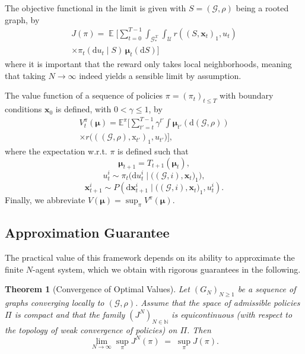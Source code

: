 \documentclass{article}
\newcommand{\E}{\operatorname{\mathbb E}}
\newtheorem{theorem}{Theorem}
\begin{document}
The objective functional in the limit is given with $S = (\mathcal{G}, \rho)$ being a rooted graph, by
\begin{multline}
    \label{equ:full_limiting_objective}
    J(\pi) = \E \Big[ \sum_{t=0}^{T-1} \int_{\mathcal{G}_*^{\mathcal{X}}} \int_{\mathcal{U}} r((S, \mathbf{x}_t)_1, u_t) \\ \times \pi_t(\mathrm du_t \mid S) \, \boldsymbol{\mu}_t(\mathrm dS) \Big]
\end{multline}
where it is important that the reward only takes local neighborhoods, meaning that taking $N \to \infty$ indeed yields a sensible limit by assumption. 

The value function of a sequence of policies $\pi = (\pi_t)_{t \le T}$ with boundary conditions $\mathbf x_0$ is defined, with $0 < \gamma \le 1$, by
\begin{multline}
    \label{equ:value_fct_def}
    V_t^{\pi}(\boldsymbol \mu) = \mathbb E ^\pi \Big[ \sum\limits_{t'=t} ^{T-1} \gamma ^{t'} \int \boldsymbol{\mu}_{t'}(\mathrm d (\mathcal G,\rho) )  \\
    \times r \big( ((\mathcal G,\rho),\mathrm x_{t'})_1,u_{t'} \big) \Big],
\end{multline}
where the expectation w.r.t. $\pi$ is defined such that
$$\boldsymbol \mu_{t+1} = T_{t+1} (\boldsymbol \mu_t),$$
$$u^i_t \sim \pi_t \big(\mathrm d u^i_t \mid \big((\mathcal G,i), \mathbf x_t \big)_1 \big),$$
$$ \mathbf x_{t+1} ^i \sim P(\mathrm d \mathbf x_{t+1} ^i \mid \big((\mathcal G,i), \mathbf x_t \big)_1,u_t ^i ).$$
Finally, we abbreviate $V(\boldsymbol \mu) = \sup_\pi V^\pi (\boldsymbol \mu)$.
\subsection{Approximation Guarantee}
The practical value of this framework depends on its ability to approximate the finite $N$-agent system, which we obtain with rigorous guarantees in the following.
\begin{theorem}[Convergence of Optimal Values] \label{thm:convergence}
Let $(G_N)_{N \ge 1}$ be a sequence of graphs converging locally to $(\mathcal{G}, \rho)$.
Assume that the space of admissible policies $\Pi$ is compact and that the family $(J^N)_{N\in\mathbb N}$
is equicontinuous (with respect to the topology of weak convergence of policies) on $\Pi$.
Then
\begin{equation}
    \lim_{N \to \infty} \sup_{\pi} J^N(\pi) \;=\; \sup_{\pi} J(\pi).
\end{equation}
\end{theorem}
\end{document}
